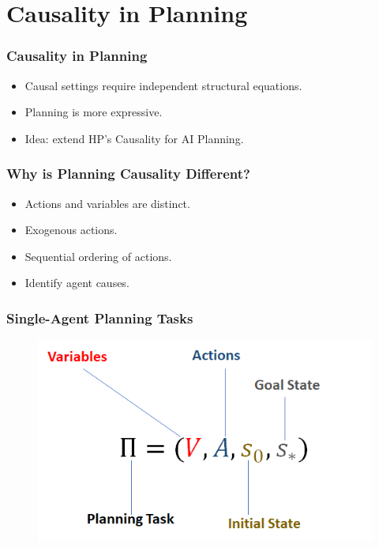 \documentclass{beamer}
\theoremstyle{plain}
\theoremstyle{definition}
\begin{document}
\section{Causality in Planning}

\begin{frame}
\frametitle{Causality in Planning}
\begin{itemize}
\item Causal settings require independent structural equations.
\item Planning is more expressive.
\item Idea: extend HP's Causality for AI Planning.
\end{itemize}

\end{frame}



\begin{frame}
\frametitle{Why is Planning Causality Different?}
\begin{itemize}
\item Actions and variables are distinct.
\item Exogenous actions.
\item Sequential ordering of actions.
\item Identify agent causes.
\end{itemize}

\end{frame}


\begin{frame}
\frametitle{Single-Agent Planning Tasks}
\begin{figure}
\includegraphics[scale=.5]{planningTask}
\end{figure}

\end{frame}
\end{document}
